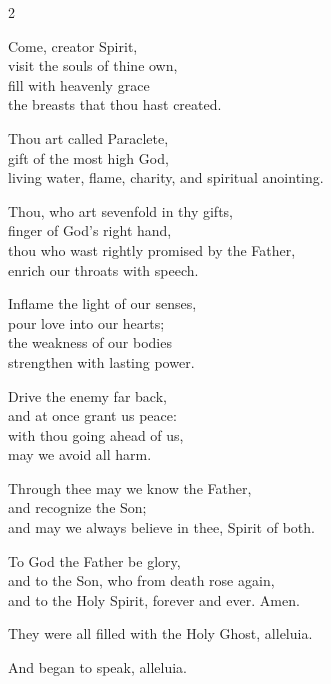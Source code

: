 \documentclass[12pt]{book}
\begin{document}
\begin{multicols}{2}
\begin{enpars}
\raggedcolumns
Come, creator Spirit,\\
visit the souls of thine own,\\
fill with heavenly grace\\
the breasts that thou hast created.

Thou art called Paraclete,\\
gift of the most high God,\\
living water, flame, charity, and spiritual anointing.

Thou, who art sevenfold in thy gifts,\\
finger of God's right hand,\\
thou who wast rightly promised by the Father,\\
enrich our throats with speech.

Inflame the light of our senses,\\
pour love into our hearts;\\
the weakness of our bodies\\
strengthen with lasting power.

Drive the enemy far back,\\
and at once grant us peace:\\
with thou going ahead of us,\\
may we avoid all harm.

Through thee may we know the Father,\\
and recognize the Son;\\
and may we always believe in thee, Spirit of both.

To God the Father be glory,\\
and to the Son, who from death rose again,\\
and to the Holy Spirit, forever and ever. Amen.

\end{enpars}
\end{multicols}


\myrule

   
      \begin{enpars} \noindent \vv They were all filled with the Holy Ghost, alleluia.

\noindent \rr And began to speak, alleluia.\end{enpars}
  
\end{document}
